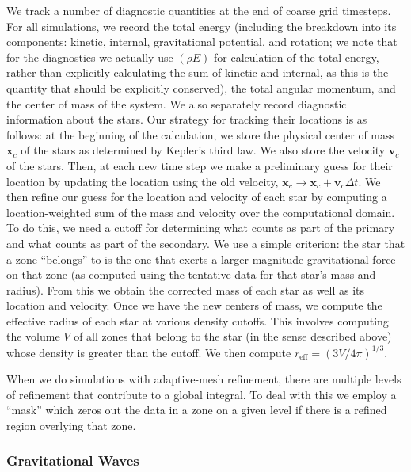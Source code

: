 \documentclass[12pt]{article}
\begin{document}
We track a number of diagnostic quantities at the end of coarse grid timesteps. 
For all simulations, we record the total energy (including the breakdown into
its components: kinetic, internal, gravitational potential, and rotation; we note
that for the diagnostics we actually use $(\rho E)$ for calculation of the total energy,
rather than explicitly calculating the sum of kinetic and internal, as this is
the quantity that should be explicitly conserved), 
the total angular momentum, and the center of mass of the system. 
We also separately record diagnostic 
information about the stars. Our strategy for tracking their 
locations is as follows: at the beginning of the calculation, we store the 
physical center of mass $\mathbf{x}_{c}$ of the stars as determined 
by Kepler's third law. We also store the velocity $\mathbf{v}_{c}$ 
of the stars. Then, at each new time step we make a preliminary guess for their 
location by updating the location using the old velocity, 
$\mathbf{x}_{c} \rightarrow \mathbf{x}_{c} + \mathbf{v}_{c} \Delta t$.
We then refine our guess for the location and velocity of each star by computing a
location-weighted sum of the mass and velocity over the computational domain. 
To do this, we need a cutoff for determining what counts as part of the primary 
and what counts as part of the secondary. We use a simple criterion: the star
that a zone ``belongs'' to is the one that exerts a larger magnitude
gravitational force on that zone (as computed using the tentative data
for that star's mass and radius). From this we obtain the corrected mass
of each star as well as its location and velocity. Once we have the new centers of mass,
we compute the effective radius of each star at various density cutoffs. This involves 
computing the volume $V$ of all zones that belong to the star (in the sense described above) 
whose density is greater than the cutoff. We then compute $r_{\text{eff}} = (3V/4\pi)^{1/3}.$

When we do simulations with adaptive-mesh refinement, there are multiple levels of refinement 
that contribute to a global integral. To deal with this we employ a ``mask'' which zeros out 
the data in a zone on a given level if there is a refined region overlying that zone.



\subsubsection{Gravitational Waves}
\label{sec:gravitational_waves}
\end{document}
